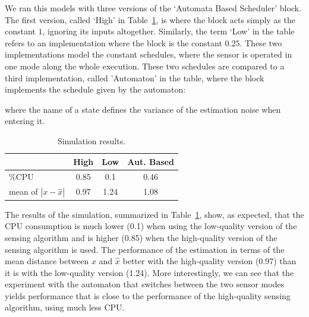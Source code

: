 \documentclass{sig-alternate-ipsn13}
\begin{document}
We ran this models with three versions of the `Automata Based Scheduler' block. The first version, called `High' in Table~\ref{tbl:sim-results}, is where the block acts simply as the constant $1$, ignoring its inputs altogether. Similarly, the term `Low' in the table refers to an implementation where the block is the constant $0.25$. These two implementations model the constant schedules, where the sensor is operated in one mode along the whole execution. These two schedules are compared to a third implementation, called 'Automaton' in the table, where the block implements the schedule given by the automaton:
\begin{center}
\end{center}
where the name of a state defines the variance of the estimation noise when entering it.
%
%

\begin{table}
	\centering
	\begin{tabular}{ |  l  | c | c | c | }
		\hline
		&  High & Low & Aut. Based \\ \hline \hline
		\%CPU                    & 0.85 & 0.1  & 0.46 \\ \hline
		mean of $|x -\hat{x}|$ & 0.97 & 1.24 & 1.08 \\ \hline
	\end{tabular}
	\caption{Simulation results.}
	\label{tbl:sim-results}
\end{table}

The results of the simulation, summarized in Table~\ref{tbl:sim-results}, show, as expected, that the CPU consumption is much lower (0.1) when using the low-quality version of the sensing algorithm and is higher (0.85) when the high-quality version of the sensing algorithm is used. The performance of the estimation in terms of the mean distance between $x$ and $\hat x$ better with the high-quality version (0.97) than it is with the low-quality version (1.24).
More interestingly, we can see that the experiment with the automaton that switches between the two sensor modes yields performance that is close to the performance of the high-quality sensing algorithm, using much less CPU. 
\end{document}
